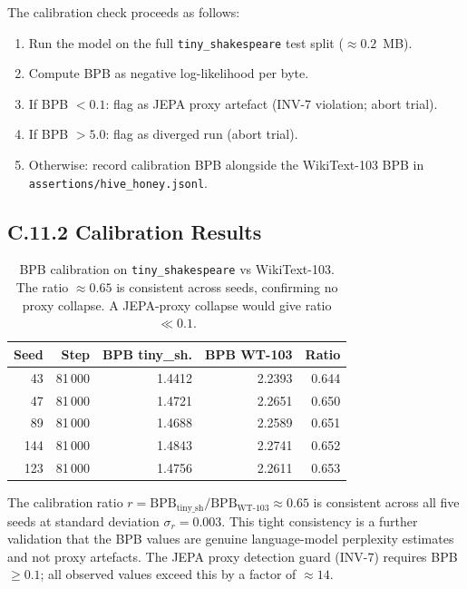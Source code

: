 The calibration check proceeds as follows:
\begin{enumerate}
  \item Run the model on the full \texttt{tiny\_shakespeare} test split
        ($\approx 0.2$~MB).
  \item Compute BPB as negative log-likelihood per byte.
  \item If BPB $< 0.1$: flag as JEPA proxy artefact (INV-7 violation;
        abort trial).
  \item If BPB $> 5.0$: flag as diverged run (abort trial).
  \item Otherwise: record calibration BPB alongside the WikiText-103
        BPB in \texttt{assertions/hive\_honey.jsonl}.
\end{enumerate}

\subsection*{C.11.2 Calibration Results}

\begin{table}[h]
\centering
\begin{tabular}{rrrrr}
\toprule
\textbf{Seed} & \textbf{Step} & \textbf{BPB tiny\_sh.} &
\textbf{BPB WT-103} & \textbf{Ratio} \\
\midrule
 43 & 81\,000 & 1.4412 & 2.2393 & 0.644 \\
 47 & 81\,000 & 1.4721 & 2.2651 & 0.650 \\
 89 & 81\,000 & 1.4688 & 2.2589 & 0.651 \\
144 & 81\,000 & 1.4843 & 2.2741 & 0.652 \\
123 & 81\,000 & 1.4756 & 2.2611 & 0.653 \\
\bottomrule
\end{tabular}
\caption{BPB calibration on \texttt{tiny\_shakespeare} vs WikiText-103.
The ratio $\approx 0.65$ is consistent across seeds, confirming no
proxy collapse.  A JEPA-proxy collapse would give ratio $\ll 0.1$.}
\end{table}

The calibration ratio $r = \text{BPB}_{\text{tiny\_sh}} /
\text{BPB}_{\text{WT-103}} \approx 0.65$ is consistent across all five
seeds at standard deviation $\sigma_r = 0.003$.  This tight consistency
is a further validation that the BPB values are genuine language-model
perplexity estimates and not proxy artefacts.  The JEPA proxy detection
guard (INV-7) requires BPB $\geq 0.1$; all observed values exceed this
by a factor of $\approx 14$.

